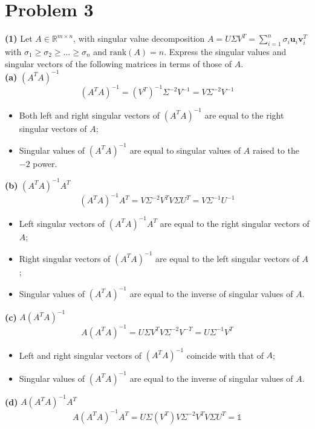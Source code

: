 \documentclass[a4paper,11pt]{article}
\newcommand{\R}{\mathbb{R}}
\begin{document}
\section*{Problem 3}

\noindent \textbf{(1)} Let $A \in \R^{m\times n}$, with singular value decomposition $A = U \Sigma V^T = \sum_{i=1}^n \sigma_i \textbf{u}_i \textbf{v}_i^T$ with $\sigma_1 \ge \sigma_2 \ge \dots \ge \sigma_n$ and $\text{rank}(A) = n$. Express the singular values and singular vectors of the following matrices in terms of those of $A$.\\

\textbf{(a)} $(A^{T}A)^{-1}$
\[(A^{T}A)^{-1} = (V^{T})^{-1}\Sigma^{-2}V^{-1}=V\Sigma^{-2}V^{-1}\]
\begin{itemize}
	\item Both left and right singular vectors of $(A^{T}A)^{-1}$ are equal to the right singular vectors of $A$;
	\item Singular values of $(A^{T}A)^{-1}$ are equal to singular values of $A$ raised to the $-2$ power.
\end{itemize}

\textbf{(b)} $(A^{T}A)^{-1}A^{T}$
\[(A^{T}A)^{-1}A^{T} = V\Sigma^{-2}V^{T}V\Sigma U^{T}=V\Sigma^{-1}U^{-1}\]
\begin{itemize}
	\item Left singular vectors of $(A^{T}A)^{-1}A^{T}$ are equal to the right singular vectors of $A$;
	\item Right singular vectors of $(A^{T}A)^{-1}$ are equal to the left singular vectors of $A$;
	\item Singular values of $(A^{T}A)^{-1}$ are equal to the inverse of singular values of $A$.
\end{itemize}

\textbf{(c)} $A(A^{T}A)^{-1}$
\[A(A^{T}A)^{-1} = U\Sigma V^{T}V\Sigma^{-2}V^{-T}=U\Sigma^{-1}V^{T}\]
\begin{itemize}
	\item Left and right singular vectors of $(A^{T}A)^{-1}$ coincide with that of $A$;
	\item Singular values of $(A^{T}A)^{-1}$ are equal to the inverse of singular values of $A$.
\end{itemize}

\textbf{(d)} $A(A^{T}A)^{-1}A^{T}$
\[A(A^{T}A)^{-1}A^{T} = U\Sigma (V^{T})V\Sigma^{-2}V^{T}V\Sigma U^{T}=\mathbb{1}\]
\end{document}
